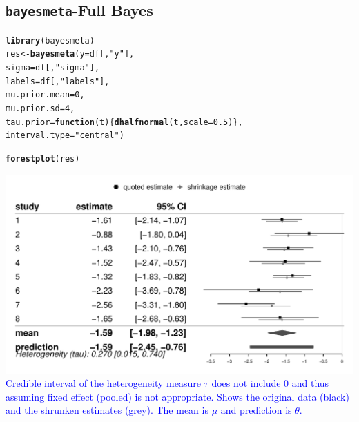 \documentclass{article}\usepackage[]{graphicx}\usepackage[]{xcolor}
\makeatletter
\def\maxwidth{ %
  \ifdim\Gin@nat@width>\linewidth
    \linewidth
  \else
    \Gin@nat@width
  \fi
}
\newcommand{\hlnum}[1]{\textcolor[rgb]{0.686,0.059,0.569}{#1}}%
\newcommand{\hlstr}[1]{\textcolor[rgb]{0.192,0.494,0.8}{#1}}%
\newcommand{\hlstd}[1]{\textcolor[rgb]{0.345,0.345,0.345}{#1}}%
\newcommand{\hlkwa}[1]{\textcolor[rgb]{0.161,0.373,0.58}{\textbf{#1}}}%
\newcommand{\hlkwb}[1]{\textcolor[rgb]{0.69,0.353,0.396}{#1}}%
\newcommand{\hlkwc}[1]{\textcolor[rgb]{0.333,0.667,0.333}{#1}}%
\newcommand{\hlkwd}[1]{\textcolor[rgb]{0.737,0.353,0.396}{\textbf{#1}}}%
\newenvironment{kframe}{%
 \def\at@end@of@kframe{}%
 \ifinner\ifhmode%
  \def\at@end@of@kframe{\end{minipage}}%
  \begin{minipage}{\columnwidth}%
 \fi\fi%
 \def\FrameCommand##1{\hskip\@totalleftmargin \hskip-\fboxsep
 \colorbox{shadecolor}{##1}\hskip-\fboxsep
     \hskip-\linewidth \hskip-\@totalleftmargin \hskip\columnwidth}%
 \MakeFramed {\advance\hsize-\width
   \@totalleftmargin\z@ \linewidth\hsize
   \@setminipage}}%
 {\par\unskip\endMakeFramed%
 \at@end@of@kframe}
\newenvironment{knitrout}{}{} %
\makeatother
\begin{document}
\begin{multicols*}{2}
\subsection{\texttt{bayesmeta}-Full Bayes}


\tiny
\begin{knitrout}
\color{fgcolor}\begin{kframe}
\begin{alltt}
\hlkwd{library}\hlstd{(bayesmeta)}
\hlstd{res} \hlkwb{<-} \hlkwd{bayesmeta}\hlstd{(}\hlkwc{y} \hlstd{= df[ ,} \hlstr{"y"}\hlstd{],}
                 \hlkwc{sigma} \hlstd{= df[ ,} \hlstr{"sigma"}\hlstd{],}
                 \hlkwc{labels} \hlstd{= df[ ,} \hlstr{"labels"}\hlstd{],}
                 \hlkwc{mu.prior.mean} \hlstd{=} \hlnum{0}\hlstd{,}
                 \hlkwc{mu.prior.sd} \hlstd{=} \hlnum{4}\hlstd{,}
                 \hlkwc{tau.prior} \hlstd{=} \hlkwa{function}\hlstd{(}\hlkwc{t}\hlstd{) \{}\hlkwd{dhalfnormal}\hlstd{(t,} \hlkwc{scale} \hlstd{=} \hlnum{0.5}\hlstd{)\},}
                 \hlkwc{interval.type} \hlstd{=} \hlstr{"central"}\hlstd{)}
\end{alltt}
\end{kframe}
\end{knitrout}
\footnotesize

\begin{knitrout}
\color{fgcolor}\begin{kframe}
\begin{alltt}
\hlkwd{forestplot}\hlstd{(res)}
\end{alltt}
\end{kframe}
\includegraphics[width=\maxwidth]{figure/forest-1} 
\end{knitrout}
\textcolor{blue}{Credible interval of the heterogeneity measure $\tau$ does not include 0 and thus assuming fixed effect (pooled) is not appropriate. Shows the original data (black) and the shrunken estimates (grey). The mean is $\mu$ and prediction is $\theta$.}


\end{multicols*}
\end{document}
